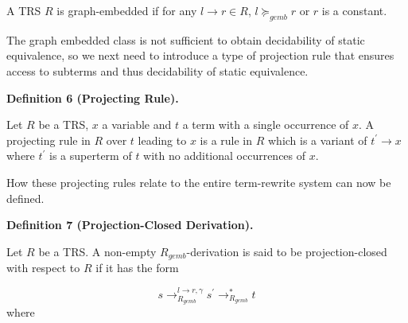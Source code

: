 \documentclass[10pt,a4paper]{amsart}
\begin{document}
 
 
A TRS $R$ is graph-embedded if for any $l\rightarrow r\in R$, $l\succcurlyeq_{gemb}r$ or $r$ is a constant.\par
 
 
 
 
The graph embedded class is not sufficient to obtain decidability of static equivalence, so we next need to introduce a type of projection rule that ensures access to subterms and thus decidability of static equivalence.\par
 
 
 
\par\medskip\noindent\textbf{Definition 6 (Projecting Rule).}\par
 
 
Let $R$ be a TRS, $x$ a variable and $t$ a term with a single occurrence of $x$. A projecting rule in $R$ over $t$ leading to $x$ is a rule in $R$ which is a variant of $t^{\prime}\rightarrow x$ where $t^{\prime}$ is a superterm of $t$ with no additional occurrences of $x$.\par
 
 
 
 
How these projecting rules relate to the entire term-rewrite system can now be defined.\par
 
 
 
\par\medskip\noindent\textbf{Definition 7 (Projection-Closed Derivation).}\par
 
 
Let $R$ be a TRS. A non-empty $R_{gemb}$-derivation is said to be projection-closed with respect to $R$ if it has the form\par
    \[s\rightarrow_{R_{gemb}}^{l\rightarrow r,\gamma}s^{\prime}\rightarrow_{R_{gemb}%
}^{*}t\]    
where\par
  
\end{document}
